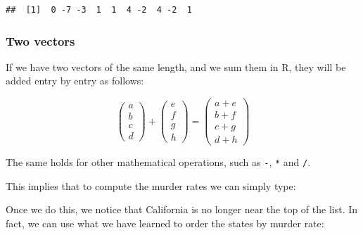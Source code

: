 \documentclass[
]{article}
\newenvironment{Shaded}{\begin{snugshade}}{\end{snugshade}}
\newcommand{\DecValTok}[1]{\textcolor[rgb]{0.00,0.00,0.81}{#1}}
\newcommand{\FunctionTok}[1]{\textcolor[rgb]{0.13,0.29,0.53}{\textbf{#1}}}
\newcommand{\NormalTok}[1]{#1}
\newcommand{\OtherTok}[1]{\textcolor[rgb]{0.56,0.35,0.01}{#1}}
\newcommand{\SpecialCharTok}[1]{\textcolor[rgb]{0.81,0.36,0.00}{\textbf{#1}}}
\begin{document}
\begin{verbatim}
##  [1]  0 -7 -3  1  1  4 -2  4 -2  1
\end{verbatim}

\subsubsection{Two vectors}\label{two-vectors}

If we have two vectors of the same length, and we sum them in R, they
will be added entry by entry as follows:

\[
\begin{pmatrix}
a\\
b\\
c\\
d
\end{pmatrix}
+
\begin{pmatrix}
e\\
f\\
g\\
h
\end{pmatrix}
=
\begin{pmatrix}
a +e\\
b + f\\
c + g\\
d + h
\end{pmatrix}
\]

The same holds for other mathematical operations, such as \texttt{-},
\texttt{*} and \texttt{/}.

This implies that to compute the murder rates we can simply type:

\begin{Shaded}
\end{Shaded}

Once we do this, we notice that California is no longer near the top of
the list. In fact, we can use what we have learned to order the states
by murder rate:

\begin{Shaded}
\end{Shaded}
\end{document}
